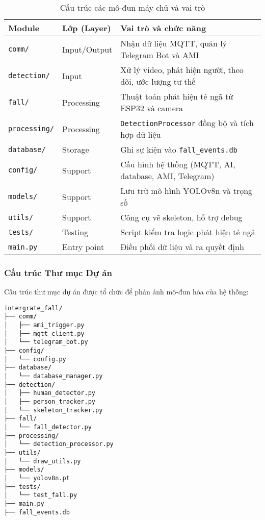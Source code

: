 \begin{table}[H]
\centering
\caption{Cấu trúc các mô-đun máy chủ và vai trò}
\label{tab:server_modules}
\begin{tabular}{|l|l|p{7cm}|}
\hline
\textbf{Module} & \textbf{Lớp (Layer)} & \textbf{Vai trò và chức năng} \\
\hline
\texttt{comm/} & Input/Output & Nhận dữ liệu MQTT, quản lý Telegram Bot và AMI \\
\hline
\texttt{detection/} & Input & Xử lý video, phát hiện người, theo dõi, ước lượng tư thế \\
\hline
\texttt{fall/} & Processing & Thuật toán phát hiện té ngã từ ESP32 và camera \\
\hline
\texttt{processing/} & Processing & \texttt{DetectionProcessor} đồng bộ và tích hợp dữ liệu \\
\hline
\texttt{database/} & Storage & Ghi sự kiện vào \texttt{fall\_events.db} \\
\hline
\texttt{config/} & Support & Cấu hình hệ thống (MQTT, AI, database, AMI, Telegram) \\
\hline
\texttt{models/} & Support & Lưu trữ mô hình YOLOv8n và trọng số \\
\hline
\texttt{utils/} & Support & Công cụ vẽ skeleton, hỗ trợ debug \\
\hline
\texttt{tests/} & Testing & Script kiểm tra logic phát hiện té ngã \\
\hline
\texttt{main.py} & Entry point & Điều phối dữ liệu và ra quyết định \\
\hline
\end{tabular}
\end{table}

\subsubsection{Cấu trúc Thư mục Dự án}
\label{subsubsec:project_structure}

Cấu trúc thư mục dự án được tổ chức để phản ánh mô-đun hóa của hệ thống:

\begin{verbatim}
intergrate_fall/
├── comm/
│   ├── ami_trigger.py
│   ├── mqtt_client.py
│   └── telegram_bot.py
├── config/
│   └── config.py
├── database/
│   └── database_manager.py
├── detection/
│   ├── human_detector.py
│   ├── person_tracker.py
│   └── skeleton_tracker.py
├── fall/
│   └── fall_detector.py
├── processing/
│   └── detection_processor.py
├── utils/
│   └── draw_utils.py
├── models/
│   └── yolov8n.pt
├── tests/
│   └── test_fall.py
├── main.py
├── fall_events.db
\end{verbatim}

